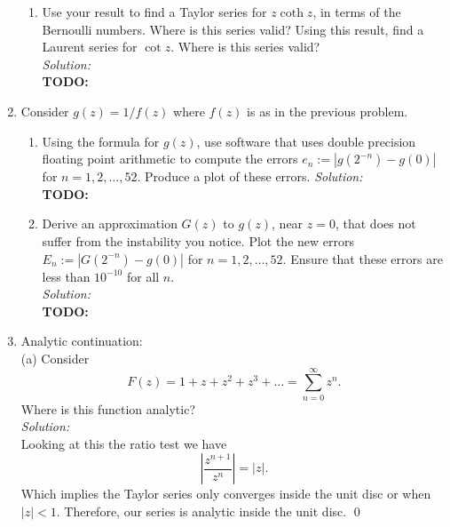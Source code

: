 \documentclass[10pt]{amsart}
\theoremstyle{nonumberplain}
\begin{document}
\begin{enumerate}[label={\bf {\arabic*}:}]
\begin{enumerate}
\item Use your result to find a Taylor series for $z \operatorname{coth} z$, in terms of the Bernoulli numbers. Where is this series valid? Using this result, find a Laurent series for $\cot z$. Where is this series valid?    \\
\textit{Solution:} \\
\textbf{TODO:} \\
\end{enumerate}
\newpage

\item Consider $g(z) = 1/f(z)$ where $f(z)$ is as in the previous
  problem.
  \begin{enumerate}
  \item Using the formula for $g(z)$, use software that uses double
    precision floating point arithmetic to compute the errors $e_n:=
    |g(2^{-n}) - g(0)|$ for $n= 1,2,\ldots, 52$.  Produce a plot of
    these errors.
\textit{Solution:} \\
\textbf{TODO:} \\

  \item Derive an approximation $G(z)$ to $g(z)$, near $z = 0$, that does not suffer
    from the instability you notice.  Plot the new errors $E_n:=
    |G(2^{-n}) - g(0)|$ for $n= 1,2,\ldots, 52$.  Ensure that these
    errors are less than $10^{-10}$ for all $n$.\\
\textit{Solution:} \\
\textbf{TODO:} \\
\end{enumerate}
\newpage

\item Analytic continuation: \\
(a) Consider
$$
F(z)=1+z+z^2+z^3+\ldots=\sum_{n=0}^{\infty} z^n .
$$
Where is this function analytic? \\
\textit{Solution:} \\
Looking at this the ratio test we have
$$
\left| \frac {z^{n + 1}}{z^n} \right| = \left| z\right|.
$$
Which implies the Taylor series only converges inside the unit disc or when $|z| < 1$.
Therefore, our series is analytic inside the unit disc.
\qed \\


\end{enumerate}
\end{document}
